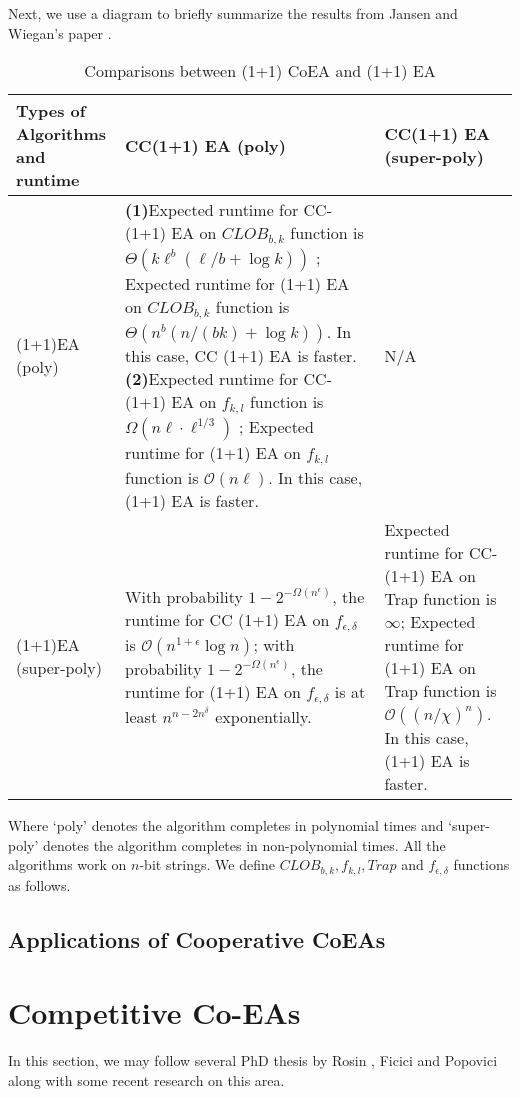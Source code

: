 \documentclass[a4paper,11pt]{report}
\theoremstyle{plain} %
\theoremstyle{definition} %
\theoremstyle{remark} %
\begin{document}
\par Next, we use a diagram to briefly summarize the results from Jansen and Wiegan's paper \citep{jansen_cooperative_2004}.


\begin{table}[h]
\centering
\begin{tabular}{ |p{3.4cm}| p{3.7cm}| p{3.7cm}| }  
 \hline 
 Types of Algorithms and runtime  & CC(1+1) EA  (poly)  &  CC(1+1) EA  (super-poly) \\ 
 \hline
(1+1)EA (poly) &
 \textbf{(1)}Expected runtime for CC-(1+1) EA on $CLOB_{b,k}$ function is $\Theta (k\ell ^b(\ell /b+\log k))$ ; Expected runtime for (1+1) EA on $CLOB_{b,k}$ function is $\Theta (n^b(n/(bk)+\log k))$. In this case, CC (1+1) EA is faster. 
\newline
\textbf{(2)}Expected runtime for CC-(1+1) EA on $f_{k,l}$ function is $\Omega(n\ell \cdot \ell ^{1/3})$ ; Expected runtime for (1+1) EA on  $f_{k,l}$ function is $\mathcal{O}(n\ell)$. In this case, (1+1) EA is faster. 

& N/A \\
 \hline
 (1+1)EA (super-poly) & 

With probability $1-2^{-\Omega(n^{\epsilon})}$, the runtime for CC (1+1) EA on $f_{\epsilon,\delta}$ is $\mathcal{O}(n^{1+\epsilon} \log n)$; with probability $1-2^{-\Omega(n^{\epsilon})}$, the runtime for (1+1) EA on $f_{\epsilon,\delta}$ is at least $n^{n-2n^{\delta}}$ exponentially. 

&  Expected runtime for CC-(1+1) EA on Trap function is $\infty$; Expected runtime for (1+1) EA on Trap function is $\mathcal{O}( (n/\chi)^n )$. In this case, (1+1) EA is faster.
 \\
 \hline
\end{tabular}

\caption{Comparisons between (1+1) CoEA and (1+1)
EA}

\end{table}

Where `poly' denotes the algorithm completes in polynomial times and `super-poly' denotes the algorithm completes in non-polynomial times. All the algorithms work on $n$-bit strings. We define $CLOB_{b,k}, f_{k,l}, Trap$ and $f_{\epsilon,\delta}$ functions as follows.

\section{Applications of Cooperative CoEAs}

\chapter{Competitive Co-EAs}
In this section, we may follow several PhD thesis by Rosin \citep{rosin1997coevolutionary}, Ficici \citep{ficici_solution_nodate} and Popovici \citep{popovici2006analysis} along with some recent research on this area. 
\end{document}
